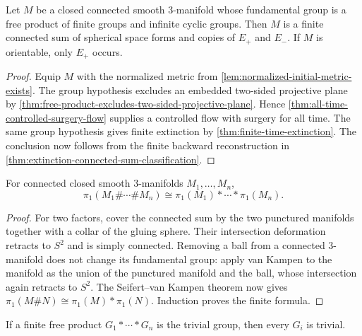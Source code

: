 \begin{theorem}
\label{thm:free-product-connected-sum-classification}
\notready
Let $M$ be a closed connected smooth $3$-manifold whose fundamental group is
a free product of finite groups and infinite cyclic groups.  Then $M$ is a
finite connected sum of spherical space forms and copies of $E_+$ and $E_-$.
If $M$ is orientable, only $E_+$ occurs.
\end{theorem}

\begin{proof}
Equip $M$ with the normalized metric from
\ref{lem:normalized-initial-metric-exists}.  The group hypothesis excludes an
embedded two-sided projective plane by
\ref{thm:free-product-excludes-two-sided-projective-plane}.  Hence
\ref{thm:all-time-controlled-surgery-flow} supplies a controlled flow with
surgery for all time.  The same group hypothesis gives finite extinction by
\ref{thm:finite-time-extinction}.  The conclusion now follows from the finite
backward reconstruction in
\ref{thm:extinction-connected-sum-classification}.
\end{proof}

\begin{theorem}
\label{thm:connected-sum-fundamental-group}
\notready
For connected closed smooth $3$-manifolds $M_1,\ldots,M_n$,
\[
 \pi_1(M_1\#\cdots\#M_n)
 \cong \pi_1(M_1)*\cdots*\pi_1(M_n).
\]
\end{theorem}

\begin{proof}
For two factors, cover the connected sum by the two punctured manifolds
together with a collar of the gluing sphere.  Their intersection deformation
retracts to $S^2$ and is simply connected.  Removing a ball from a connected
$3$-manifold does not change its fundamental group: apply van Kampen to the
manifold as the union of the punctured manifold and the ball, whose
intersection again retracts to $S^2$.  The Seifert--van Kampen theorem now
gives $\pi_1(M\#N)\cong\pi_1(M)*\pi_1(N)$.  Induction proves the finite formula.
\end{proof}

\begin{lemma}
\label{lem:trivial-free-product-factors}
\notready
If a finite free product $G_1*\cdots*G_n$ is the trivial group, then every
$G_i$ is trivial.
\end{lemma}

